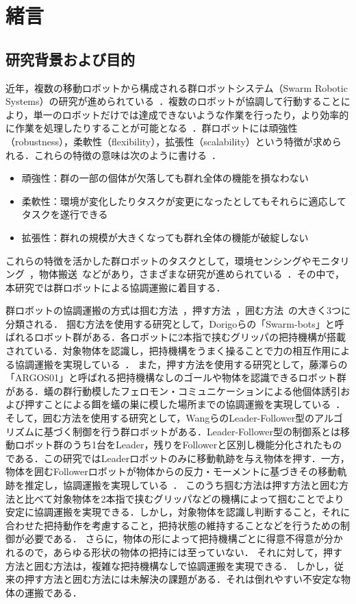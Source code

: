 \chapter{緒言}
\section{研究背景および目的}
\label{緒言}
近年，複数の移動ロボットから構成される群ロボットシステム（Swarm Robotic Systems）の研究が進められている~\cite{multiRobotCoodination}．複数のロボットが協調して行動することにより，単一のロボットだけでは達成できないような作業を行ったり，より効率的に作業を処理したりすることが可能となる~\cite{swarm}．群ロボットには頑強性（robustness），柔軟性（flexibility），拡張性（scalability）という特徴が求められる．これらの特徴の意味は次のように書ける~\cite{swarmBehaviour}．
\begin{itemize}
 \item 頑強性：群の一部の個体が欠落しても群れ全体の機能を損なわない
 \item 柔軟性：環境が変化したりタスクが変更になったとしてもそれらに適応してタスクを遂行できる
 \item 拡張性：群れの規模が大きくなっても群れ全体の機能が破綻しない
\end{itemize}
これらの特徴を活かした群ロボットのタスクとして，環境センシングやモニタリング~\cite{sensing,monitoring}，物体搬送~\cite{motionPlanning}などがあり，さまざまな研究が進められている~\cite{mrs}．その中で，本研究では群ロボットによる協調運搬に着目する．

群ロボットの協調運搬の方式は掴む方法~\cite{grasp1,grasp2,grasp3,swarmBot}，押す方法~\cite{push-only1,push-only2,push-only3,argos}，囲む方法~\cite{caging1,caging2,caging3}の大きく3つに分類される．
掴む方法を使用する研究として，Dorigoらの「Swarm-bots」と呼ばれるロボット群がある．各ロボットに2本指で挟むグリッパの把持機構が搭載されている．対象物体を認識し，把持機構をうまく操ることで力の相互作用による協調運搬を実現している~\cite{swarmBot}．
また，押す方法を使用する研究として，藤澤らの「ARGOS01」と呼ばれる把持機構なしのゴールや物体を認識できるロボット群がある．蟻の群行動模したフェロモン・コミュニケーションによる他個体誘引および押すことによる餌を蟻の巣に模した場所までの協調運搬を実現している~\cite{argos}．
そして，囲む方法を使用する研究として，WangらのLeader-Follower型のアルゴリズムに基づく制御を行う群ロボットがある．Leader-Follower型の制御系とは移動ロボット群のうち1台をLeader，残りをFollowerと区別し機能分化されたものである．この研究ではLeaderロボットのみに移動軌跡を与え物体を押す．一方，物体を囲むFollowerロボットが物体からの反力・モーメントに基づきその移動軌跡を推定し，協調運搬を実現している~\cite{caging1}．
このうち掴む方法は押す方法と囲む方法と比べて対象物体を2本指で挟むグリッパなどの機構によって掴むことでより安定に協調運搬を実現できる．しかし，対象物体を認識し判断すること，それに合わせた把持動作を考慮すること，把持状態の維持することなどを行うための制御が必要である．
さらに，物体の形によって把持機構ごとに得意不得意が分かれるので，あらゆる形状の物体の把持には至っていない．
それに対して，押す方法と囲む方法は，複雑な把持機構なしで協調運搬を実現できる．
しかし，従来の押す方法と囲む方法には未解決の課題がある．それは倒れやすい不安定な物体の運搬である．

